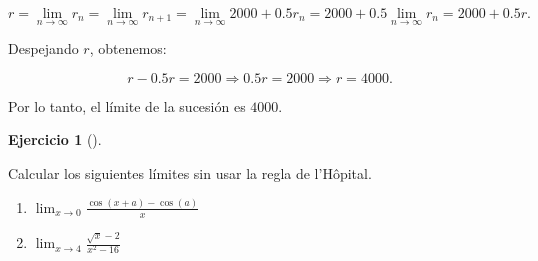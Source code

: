\documentclass[
  spanish,
  a4paper,
]{scrreport}
\providecommand{\tightlist}{%
  \setlength{\itemsep}{0pt}\setlength{\parskip}{0pt}}
\theoremstyle{definition}
\newtheorem{exercise}{Ejercicio}[chapter]
\theoremstyle{remark}
\begin{document}
\begin{tcolorbox}
\[
r = \lim_{n\to \infty} r_n = \lim_{n\to \infty} r_{n+1} = \lim_{n\to \infty} 2000 + 0.5 r_n = 2000 + 0.5 \lim_{n\to \infty} r_n = 2000 + 0.5 r.
\]

Despejando \(r\), obtenemos:

\[
r - 0.5 r = 2000 \Rightarrow 0.5 r = 2000 \Rightarrow r = 4000.
\]

Por lo tanto, el límite de la sucesión es \(4000\).

\end{tcolorbox}

\begin{exercise}[]\protect\hypertarget{exr-3}{}\label{exr-3}

Calcular los siguientes límites sin usar la regla de l'Hôpital.

\begin{enumerate}
\def\labelenumi{\alph{enumi}.}
\tightlist
\item
  \(\displaystyle \lim_{x\to 0} \frac{\cos(x+a)-\cos(a)}{x}\)
\item
  \(\displaystyle \lim_{x\to 4} \frac{\sqrt{x}-2}{x^2-16}\)
\end{enumerate}

\end{exercise}
\end{document}
